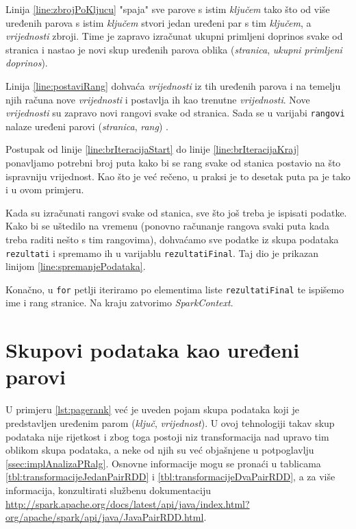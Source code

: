 \documentclass[times, utf8, zavrsni, numeric]{fer}
\begin{document}
Linija \ref{line:zbrojPoKljucu} "spaja" sve parove s istim \emph{ključem} tako što od više uređenih parova s istim \emph{ključem} stvori jedan uređeni par s tim \emph{ključem}, a \emph{vrijednosti} zbroji. Time je zapravo izračunat ukupni primljeni doprinos svake od stranica i nastao je novi skup uređenih parova oblika (\emph{stranica}, \emph{ukupni primljeni doprinos}). 

Linija \ref{line:postaviRang} dohvaća \emph{vrijednosti} iz tih uređenih parova i na temelju njih računa nove \emph{vrijednosti} i postavlja ih kao trenutne \emph{vrijednosti}. Nove \emph{vrijednosti} su zapravo novi rangovi svake od stranica. Sada se u varijabi \texttt{rangovi} nalaze uređeni parovi (\emph{stranica}, \emph{rang}) . 

Postupak od linije \ref{line:brIteracijaStart} do linije \ref{line:brIteracijaKraj} ponavljamo potrebni broj puta kako bi se rang svake od stanica postavio na što ispravniju vrijednost. Kao što je već rečeno, u praksi je to desetak puta pa je tako i u ovom primjeru.

Kada su izračunati rangovi svake od stanica, sve što još treba je ispisati podatke. Kako bi se uštedilo na vremenu (ponovno računanje rangova svaki puta kada treba raditi nešto s tim rangovima), dohvaćamo sve podatke iz skupa podataka \texttt{rezultati} i spremamo ih u varijablu \texttt{rezultatiFinal}. Taj dio je prikazan linijom \ref{line:spremanjePodataka}.

Konačno, u \texttt{for} petlji iteriramo po elementima liste \texttt{rezultatiFinal} te ispišemo ime i rang stranice. Na kraju zatvorimo \emph{SparkContext}.


\section{Skupovi podataka kao uređeni parovi}
U primjeru \ref{lst:pagerank} već je uveden pojam skupa podataka koji je predstavljen uređenim parom (\emph{ključ}, \emph{vrijednost}). U ovoj tehnologiji takav skup podataka nije rijetkost i zbog toga postoji niz transformacija nad upravo tim oblikom skupa podataka, a neke od njih su već objašnjene u potpoglavlju \ref{ssec:implAnalizaPRalg}. Osnovne informacije mogu se pronaći u tablicama \ref{tbl:transformacijeJedanPairRDD} i \ref{tbl:transformacijeDvaPairRDD}, a za više informacija, konzultirati službenu dokumentaciju \url{http://spark.apache.org/docs/latest/api/java/index.html?org/apache/spark/api/java/JavaPairRDD.html}.
\end{document}
